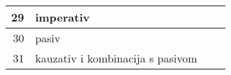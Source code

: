 	\begin{tabular}{|r|p{150pt}|p{150pt}|p{120pt}|}
		\hline
		29&imperativ&&\\
		\hline
		30&pasiv&&\\
		\hline
		31&kauzativ i kombinacija s pasivom&&\\
		\hline
	\end{tabular}

